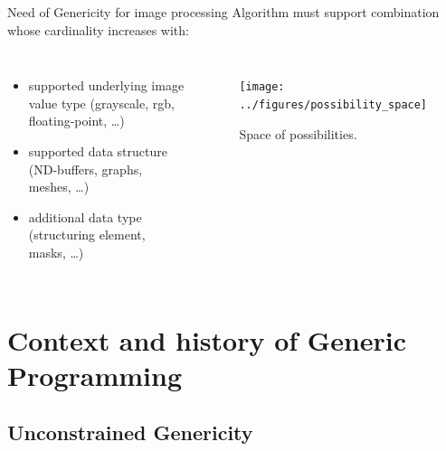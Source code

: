 \documentclass[12pt,aspectratio=169]{beamer}
\begin{document}
\begin{frame}[fragile]{Need of Genericity for image processing}
  Algorithm must support combination whose cardinality increases with:

  \begin{columns}[T,onlytextwidth]
    \begin{itemize}
      \item supported underlying image value type (grayscale, rgb, floating-point, \ldots)
      \item supported data structure (ND-buffers, graphs, meshes, \ldots)
      \item additional data type (structuring element, masks, \ldots)
    \end{itemize}

    \begin{figure}[htbp]
      \centering
      \texttt{[image: ../figures/possibility\_space]}
      \caption{Space of possibilities.}
      \label{fig:int.possibility_space}
    \end{figure}
  \end{columns}
\end{frame}

%
%
%


\section[Context and history of Generic Programming]{Context and history of Generic Programming}

\subsection[Unconstrained Genericity]{Unconstrained Genericity}
\end{document}
